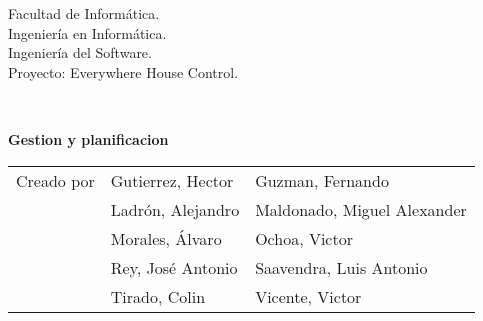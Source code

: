 \begin{titlepage}
    \begin{scriptsize}\noindent Facultad de Informática.\\
        Ingeniería en Informática.\\
        Ingeniería del Software.\\
        Proyecto: Everywhere House Control.
    \end{scriptsize}\\
    \vfill
    \begin{center}
        \begin{Large}
            \textbf{Gestion y planificacion}
        \end{Large}
    \end{center}
    \vfill
    \begin{flushright}
        \begin{scriptsize}
            \begin{tabular}{lll}
                Creado por & Gutierrez, Hector & Guzman, Fernando\\
                & Ladrón, Alejandro & Maldonado, Miguel Alexander\\
                & Morales, Álvaro & Ochoa, Victor\\
                & Rey, José Antonio & Saavendra, Luis Antonio\\
                & Tirado, Colin & Vicente, Victor\\
            \end{tabular}
        \end{scriptsize}
    \end{flushright}
\end{titlepage}
\thispagestyle{empty}
\cleardoublepage
\newpage

\tableofcontents
\newpage
\thispagestyle{empty}
\cleardoublepage
\newpage
{}
\raggedbottom
{}

    
    
    
    
    
    

